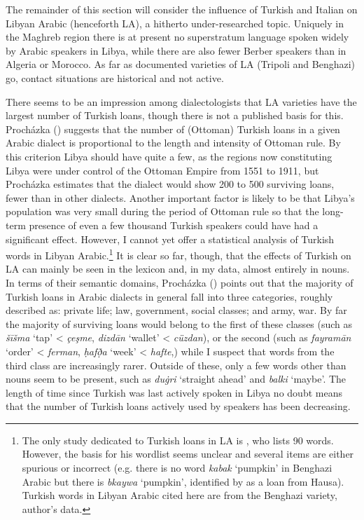 \documentclass[output=paper]{langsci/langscibook}
\begin{document}
The remainder of this section will consider the influence of Turkish and Italian on Libyan Arabic (henceforth LA), a hitherto under-researched topic. Uniquely in the Maghreb region there is at present no superstratum language spoken widely by Arabic speakers in Libya, while there are also fewer Berber speakers than in Algeria or Morocco. As far as documented varieties of LA (Tripoli and Benghazi) go, contact situations are historical and not active.

  There seems to be an impression among dialectologists that LA varieties have the largest number of Turkish loans, though there is not a published basis for this. Procházka (\citeyear[191]{Procházka2005}) suggests that the number of (Ottoman) Turkish loans in a given Arabic dialect is proportional to the length and intensity of Ottoman rule. By this criterion Libya should have quite a few, as the regions now constituting Libya were under control of the Ottoman Empire from 1551 to 1911, but Procházka estimates that the dialect would show 200 to 500 surviving loans, fewer than in other dialects. Another important factor is likely to be that Libya’s population was very small during the period of Ottoman rule so that the long-term presence of even a few thousand Turkish speakers could have had a significant effect. However, I cannot yet offer a statistical analysis of Turkish words in Libyan Arabic.\footnote{The only study dedicated to Turkish loans in LA is \citet{Türkmen1988}, who lists 90 words. However, the basis for his wordlist seems unclear and  several items are either spurious or incorrect (e.g. there is no word \textit{kabak} ‘pumpkin’ in Benghazi Arabic but there is \textit{bkaywa} ‘pumpkin’, identified by \citet{Souag2013lexical} as a loan from Hausa). Turkish words in Libyan Arabic cited here are from the Benghazi variety, author’s data.} It is clear so far, though, that the effects of Turkish on LA can mainly be seen in the lexicon and, in my data, almost entirely in nouns. In terms of their semantic domains, Procházka (\citeyear[192]{Procházka2005}) points out that the majority of Turkish loans in Arabic dialects in general fall into three categories, roughly described as: private life; law, government, social classes; and army, war. By far the majority of surviving loans would belong to the first of these classes (such as \textit{šīšma} ‘tap’ < \textit{çeşme}, \textit{dizdān} ‘wallet’ < \textit{cüzdan}), or the second (such as \textit{fayramān} ‘order’ < \textit{ferman}, \textit{ḥafð̣a} ‘week’ < \textit{hafte},) while I suspect that words from the third class are increasingly rarer. Outside of these, only a few words other than nouns seem to be present, such as \textit{du\.gri} ‘straight ahead’ and \textit{balki} ‘maybe’. The length of time since Turkish was last actively spoken in Libya no doubt means that the number of Turkish loans actively used by speakers has been decreasing.
\end{document}
